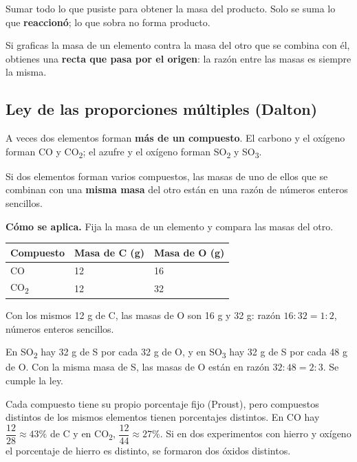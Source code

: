 \begin{ojo} Sumar todo lo que pusiste para obtener la masa del producto. Solo se suma lo que \textbf{reaccionó}; lo que sobra no forma producto.\end{ojo}
 
\begin{clave}[{En un gráfico}] Si graficas la masa de un elemento contra la masa del otro que se combina con él, obtienes una \textbf{recta que pasa por el origen}: la razón entre las masas es siempre la misma.\end{clave}
\subsection{Ley de las proporciones múltiples (Dalton)}
A veces dos elementos forman \textbf{más de un compuesto}. El carbono y el oxígeno forman CO y CO\textsubscript{2}; el azufre y el oxígeno forman SO\textsubscript{2} y SO\textsubscript{3}.

 
\begin{clave} Si dos elementos forman varios compuestos, las masas de uno de ellos que se combinan con una \textbf{misma masa} del otro están en una razón de números enteros sencillos.\end{clave}
 

\textbf{Cómo se aplica.} Fija la masa de un elemento y compara las masas del otro.

 
\begin{center}\small
\begin{tabular}{@{}lll@{}}
\toprule
\textbf{Compuesto} & \textbf{Masa de C (g)} & \textbf{Masa de O (g)} \\
\midrule
CO & 12 & 16 \\
CO\textsubscript{2} & 12 & 32 \\
\bottomrule
\end{tabular}
\end{center}
 

Con los mismos 12 g de C, las masas de O son 16 g y 32 g: razón $16 : 32 = 1 : 2$, números enteros sencillos.

  
\begin{ejemplo} En SO\textsubscript{2} hay 32 g de S por cada 32 g de O, y en SO\textsubscript{3} hay 32 g de S por cada 48 g de O. Con la misma masa de S, las masas de O están en razón $32 : 48 = 2 : 3$.  Se cumple la ley.\end{ejemplo}
 
\begin{ojo} Cada compuesto tiene su propio porcentaje fijo (Proust), pero compuestos distintos de los mismos elementos tienen porcentajes distintos. En CO hay $\dfrac{12}{28}\approx 43\%$ de C y en CO\textsubscript{2}, $\dfrac{12}{44}\approx 27\%$. Si en dos experimentos con hierro y oxígeno el porcentaje de hierro es distinto, se formaron dos óxidos distintos.\end{ojo}
 
